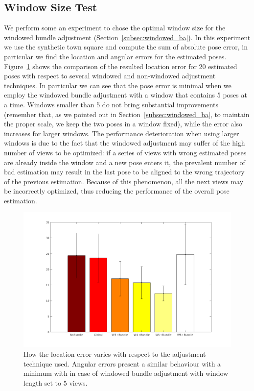 \subsection{Window Size Test}
We perform some an experiment to chose the optimal window size for the windowed
bundle adjustment (Section~\ref{subsec:windowed_ba}). In this experiment we 
use the synthetic town square and compute the sum of absolute pose error, in
particular we find the location and angular errors for the estimated poses.
Figure~\ref{fig:sumAbsLocError} shows the comparison of the resulted location error for 20
estimated poses with respect to several windowed and non-windowed adjustment
techniques.
In particular we can see that the pose error is minimal when we employ the
windowed bundle adjustment with a window that contains 5 poses at a time.
Windows smaller than 5 do not bring substantial improvements (remember that,
as we pointed out in Section~\ref{subsec:windowed_ba}, to maintain the proper scale, we keep the two poses
in a window fixed), while the error also increases
for larger windows. The performance deterioration when using larger windows
is due to the fact that the windowed adjustment may suffer of the high number
of views to be optimized: if a series of views with wrong estimated poses are
already inside the window and a new pose enters it, the prevalent number of
bad estimation may result in the last pose to be aligned to the wrong trajectory
of the previous estimation. Because of this phenomenon, all the next views
may be incorrectly optimized, thus reducing the performance of the overall
pose estimation.
%
\begin{figure}[h]
\centering
\includegraphics[width=\linewidth]{img/sumAbsLocError.png}
\caption{How the location error varies with respect to the adjustment technique
used. Angular errors present a similar behaviour with a minimum with in case
of windowed bundle adjustment with window length set to 5 views.}
\label{fig:sumAbsLocError}
\end{figure}

